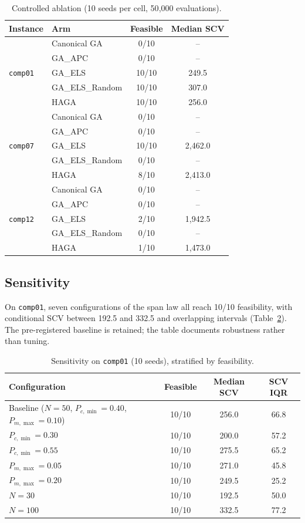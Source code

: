 \documentclass[journal]{IEEEtran}
\newcommand{\code}[1]{\texttt{#1}}
\begin{document}
\begin{table}[!t]
\caption{Controlled ablation (10 seeds per cell, 50{,}000 evaluations).}
\label{tab:ablation}
\centering
\small
\begin{tabular}{ll c c}
\toprule
Instance & Arm & Feasible & Median SCV \\
\midrule
\multirow{5}{*}{\code{comp01}}
& Canonical GA      & 0/10 & -- \\
& GA\_APC           & 0/10 & -- \\
& GA\_ELS           & 10/10 & 249.5 \\
& GA\_ELS\_Random   & 10/10 & 307.0 \\
& HAGA              & 10/10 & 256.0 \\
\midrule
\multirow{5}{*}{\code{comp07}}
& Canonical GA      & 0/10 & -- \\
& GA\_APC           & 0/10 & -- \\
& GA\_ELS           & 10/10 & 2{,}462.0 \\
& GA\_ELS\_Random   & 0/10 & -- \\
& HAGA              & 8/10 & 2{,}413.0 \\
\midrule
\multirow{5}{*}{\code{comp12}}
& Canonical GA      & 0/10 & -- \\
& GA\_APC           & 0/10 & -- \\
& GA\_ELS           & 2/10 & 1{,}942.5 \\
& GA\_ELS\_Random   & 0/10 & -- \\
& HAGA              & 1/10 & 1{,}473.0 \\
\bottomrule
\end{tabular}
\end{table}

\subsection{Sensitivity}
On \code{comp01}, seven configurations of the span law all reach 10/10 feasibility, with conditional SCV between 192.5 and 332.5 and overlapping intervals (Table~\ref{tab:sensitivity}). The pre-registered baseline is retained; the table documents robustness rather than tuning.

\begin{table}[!t]
\caption{Sensitivity on \code{comp01} (10 seeds), stratified by feasibility.}
\label{tab:sensitivity}
\centering
\small
\begin{tabular}{l c c c}
\toprule
Configuration & Feasible & Median SCV & SCV IQR \\
\midrule
Baseline ($N=50$, $P_{c,\min}=0.40$, $P_{m,\max}=0.10$) & 10/10 & 256.0 & 66.8 \\
$P_{c,\min}=0.30$ & 10/10 & 200.0 & 57.2 \\
$P_{c,\min}=0.55$ & 10/10 & 275.5 & 65.2 \\
$P_{m,\max}=0.05$ & 10/10 & 271.0 & 45.8 \\
$P_{m,\max}=0.20$ & 10/10 & 249.5 & 25.2 \\
$N=30$ & 10/10 & 192.5 & 50.0 \\
$N=100$ & 10/10 & 332.5 & 77.2 \\
\bottomrule
\end{tabular}
\end{table}
\end{document}
